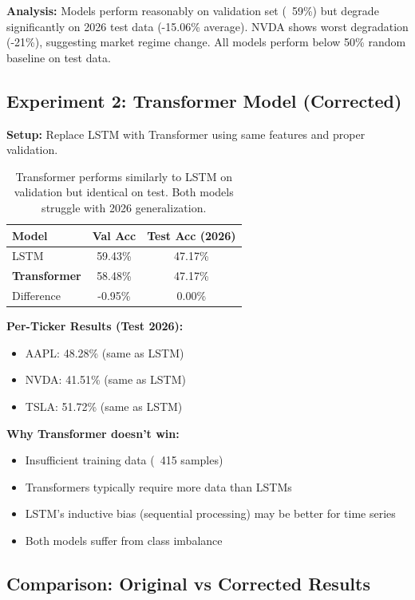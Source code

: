 \documentclass[10pt,twocolumn]{article}
\begin{document}
\textbf{Analysis:} Models perform reasonably on validation set (~59\%) but degrade significantly on 2026 test data (-15.06\% average). NVDA shows worst degradation (-21\%), suggesting market regime change. All models perform below 50\% random baseline on test data.

\subsection{Experiment 2: Transformer Model (Corrected)}

\textbf{Setup:} Replace LSTM with Transformer using same features and proper validation.

\begin{table}[h]
\centering
\small
\begin{tabular}{lcc}
\toprule
Model & Val Acc & Test Acc (2026) \\
\midrule
LSTM & 59.43\% & 47.17\% \\
\textbf{Transformer} & 58.48\% & 47.17\% \\
\midrule
Difference & -0.95\% & 0.00\% \\
\bottomrule
\end{tabular}
\caption{Transformer performs similarly to LSTM on validation but identical on test. Both models struggle with 2026 generalization.}
\end{table}

\textbf{Per-Ticker Results (Test 2026):}
\begin{itemize}
\item AAPL: 48.28\% (same as LSTM)
\item NVDA: 41.51\% (same as LSTM)
\item TSLA: 51.72\% (same as LSTM)
\end{itemize}

\textbf{Why Transformer doesn't win:}
\begin{itemize}
\item Insufficient training data (~415 samples)
\item Transformers typically require more data than LSTMs
\item LSTM's inductive bias (sequential processing) may be better for time series
\item Both models suffer from class imbalance
\end{itemize}

\subsection{Comparison: Original vs Corrected Results}
\end{document}
